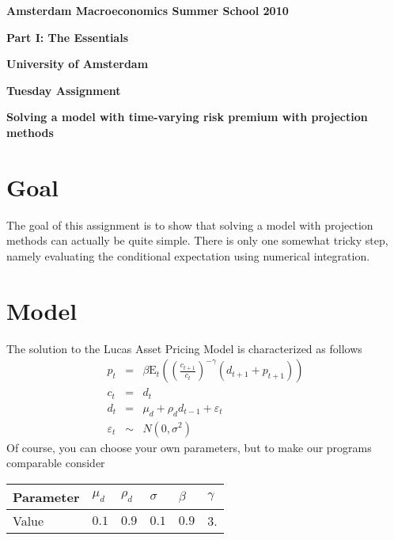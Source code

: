\documentclass{article}
\begin{document}
\begin{center}
\textbf{Amsterdam Macroeconomics Summer School 2010}

\textbf{Part I: The Essentials}

\textbf{University of Amsterdam\bigskip }

\textbf{Tuesday Assignment}

\textbf{Solving a model with time-varying risk premium with projection
methods\bigskip }
\end{center}

\section{Goal}

The goal of this assignment is to show that solving a model with projection
methods can actually be quite simple. There is only one somewhat tricky
step, namely evaluating the conditional expectation using numerical
integration.

\section{Model}

The solution to the Lucas Asset Pricing Model is characterized as follows%
\begin{eqnarray*}
p_{t} &=&\beta \text{E}_{t}\left( \left( \frac{c_{t+1}}{c_{t}}\right)
^{-\gamma }\left( d_{t+1}+p_{t+1}\right) \right) \\
c_{t} &=&d_{t} \\
d_{t} &=&\mu _{d}+\rho _{d}d_{t-1}+\varepsilon _{t} \\
\varepsilon _{t} &\sim &N\left( 0,\sigma ^{2}\right)
\end{eqnarray*}%
Of course, you can choose your own parameters, but to make our programs
comparable consider\newline
\begin{center}%
\begin{tabular}{l|lllll}
Parameter & $\mu _{d}$ & $\rho _{d}$ & $\sigma $ & $\beta $ & $\gamma $ \\ 
\hline
Value & $0.1$ & $0.9$ & $0.1$ & $0.9$ & $3$.%
\end{tabular}%
\end{center}%
\end{document}
